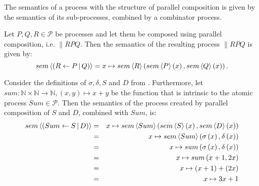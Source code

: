 The semantics of a process with the structure of parallel composition is given by the semantics of its sub-processes, combined by a combinator process.
\begin{definition}
\label{def:sem_parallel}
Let $P, Q, R \in \mathcal{P}$ be processes and let them be composed using parallel composition, i.e. $\parallel{R}{P}{Q}$. Then the semantics of the resulting process $\parallel{R}{P}{Q}$ is given by:
  \begin{equation*}
    \label{eqn:sem_parallel}
    sem \left\langle \left( R \gets P \, | \, Q \right) \right\rangle = x \mapsto sem \left\langle R \right\rangle \left( sem \left\langle P \right\rangle \left( x \right), sem \left\langle Q \right\rangle \left( x \right) \right).
  \end{equation*}
  \hfill\qedsymbol
\end{definition}


\begin{example}
\label{exp:sem_parallel}
Consider the definitions of $\sigma, \delta, S$ and $D$ from . Furthermore, let $sum \colon \mathbb{N} \times \mathbb{N} \to \mathbb{N}, \left( x, y \right) \mapsto x + y$ be the function that is intrinsic to the atomic process $Sum \in \mathcal{P}$. Then the semantics of the process created by parallel composition of $S$ and $D$, combined with $Sum$, is: 
  \begin{eqnarray*}
    sem \left\langle \left( Sum \gets S \, | \, D \right) \right\rangle & = & x \mapsto sem \left\langle Sum \right\rangle{\left( sem \left\langle S \right\rangle \left( x \right), sem \left\langle D \right\rangle \left( x \right) \right)} \\
                               & = & x \mapsto sem \left\langle Sum \right\rangle{\left( \sigma\left(x\right), \delta\left(x\right) \right)} \\
                               & = & x \mapsto sum \left( \sigma\left(x\right), \delta\left(x\right) \right) \\
                               & = & x \mapsto sum \left( x+1, 2x \right) \\
                               & = & x \mapsto \left( x+1 \right) + \left( 2x \right) \\
                               & = & x \mapsto 3x + 1
  \end{eqnarray*}
\end{example}


